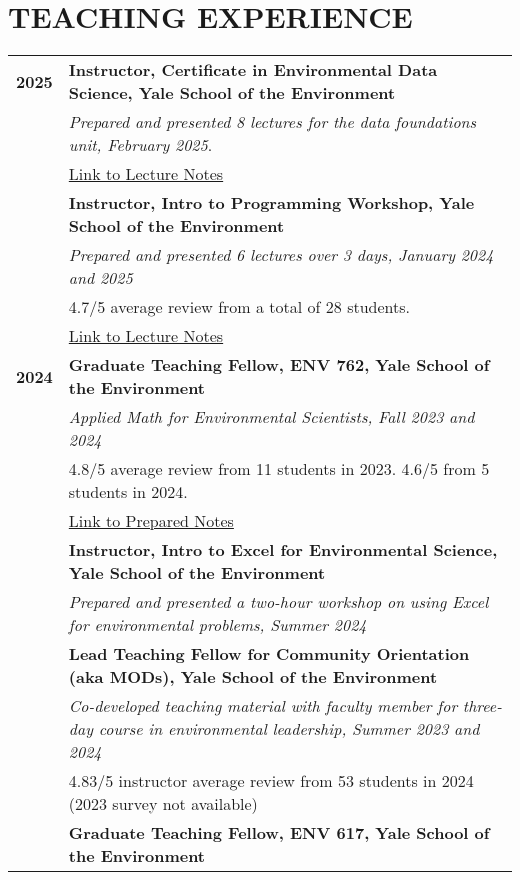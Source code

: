 \documentclass[11pt]{article}
\begin{document}
\section*{TEACHING EXPERIENCE}
\begin{tabularx}{\linewidth}{>{\bfseries}r X} %
2025 & \textbf{Instructor, Certificate in Environmental Data Science, Yale School of the Environment} \\
    & \textit{Prepared and presented 8 lectures for the data foundations unit, February 2025}.\\ 
    & \href{https://github.com/a5creel/yse_data_science_certificate}{Link to Lecture Notes} \\[1ex]
    & \textbf{Instructor, Intro to Programming Workshop, Yale School of the Environment} \\
    & \textit{Prepared and presented 6 lectures over 3 days, January 2024 and 2025} \\
    & 4.7/5 average review from a total of 28 students.\\
    &  \href{https://github.com/a5creel/intro_to_programming}{Link to Lecture Notes}  \\[1ex]
2024 & \textbf{Graduate Teaching Fellow, ENV 762, Yale School of the Environment} \\
    & \textit{Applied Math for Environmental Scientists, Fall 2023 and 2024} \\
    & 4.8/5 average review from 11 students in 2023. 4.6/5 from 5 students in 2024. \\
    & \href{https://github.com/a5creel/AMES}{Link to Prepared Notes} \\[1ex]    
    & \textbf{Instructor, Intro to Excel for Environmental Science, Yale School of the Environment} \\
    & \textit{Prepared and presented a two-hour workshop on using Excel for environmental problems, Summer 2024} \\[1ex]
    & \textbf{Lead Teaching Fellow for Community Orientation (aka MODs), Yale School of the Environment} \\
    & \textit{Co-developed teaching material with faculty member for three-day course in environmental leadership, Summer 2023 and 2024} \\
    & 4.83/5 instructor average review from 53 students in 2024 (2023 survey not available) \\[1ex]
    & \textbf{Graduate Teaching Fellow, ENV 617, Yale School of the Environment} \\

\end{tabularx}
\end{document}
